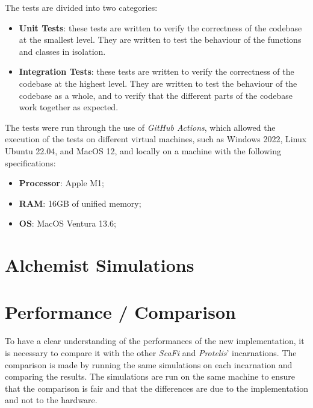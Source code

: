 The tests are divided into two categories:
\begin{itemize}
    \item \textbf{Unit Tests}: these tests are written to verify the correctness of the codebase at the smallest level.
        They are written to test the behaviour of the functions and classes in isolation.
    \item \textbf{Integration Tests}: these tests are written to verify the correctness of the codebase at the highest level.
        They are written to test the behaviour of the codebase as a whole, and to verify that the different parts of the
        codebase work together as expected.
\end{itemize}
The tests were run through the use of \emph{GitHub Actions}, which allowed the execution of the tests on different virtual
machines, such as Windows 2022, Linux Ubuntu 22.04, and MacOS 12, and locally on a machine with the following specifications:
\begin{itemize}
    \item \textbf{Processor}: Apple M1;
    \item \textbf{RAM}: 16GB of unified memory;
    \item \textbf{OS}: MacOS Ventura 13.6;
\end{itemize}

\section{Alchemist Simulations}
\label{sec:alchemist-simulations}


\section{Performance / Comparison}
\label{sec:performance-/-comparison}
To have a clear understanding of the performances of the new implementation, it is necessary to compare it with the other
\emph{ScaFi} and \emph{Protelis}' incarnations.
The comparison is made by running the same simulations on each incarnation and comparing the results.
The simulations are run on the same machine to ensure that the comparison is fair and that the differences are due to the
implementation and not to the hardware.

